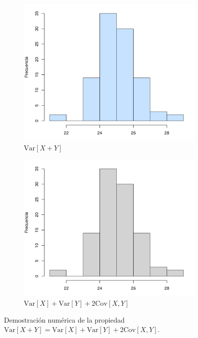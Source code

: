 \documentclass[12pt]{article}
\begin{document}
	\begin{figure}
		\begin{subfigure}{0.5\textwidth}
			\centering
			\includegraphics[scale=0.5]{var_suma.png}
			\caption{$\text{Var}[X+Y]$}
		\end{subfigure}
		\begin{subfigure}{0.5\textwidth}
			\centering
			\includegraphics[scale=0.5]{var_resultado.png}
			\caption{$\text{Var}[X] + \text{Var}[Y] + 2\text{Cov}[X, Y]$}
		\end{subfigure}
		\caption{Demostración numérica de la propiedad  $\text{Var}[X+Y] = \text{Var}[X] + \text{Var}[Y] + 2\text{Cov}[X, Y]$.}
		\label{cov}
	\end{figure}
	


\end{document}
